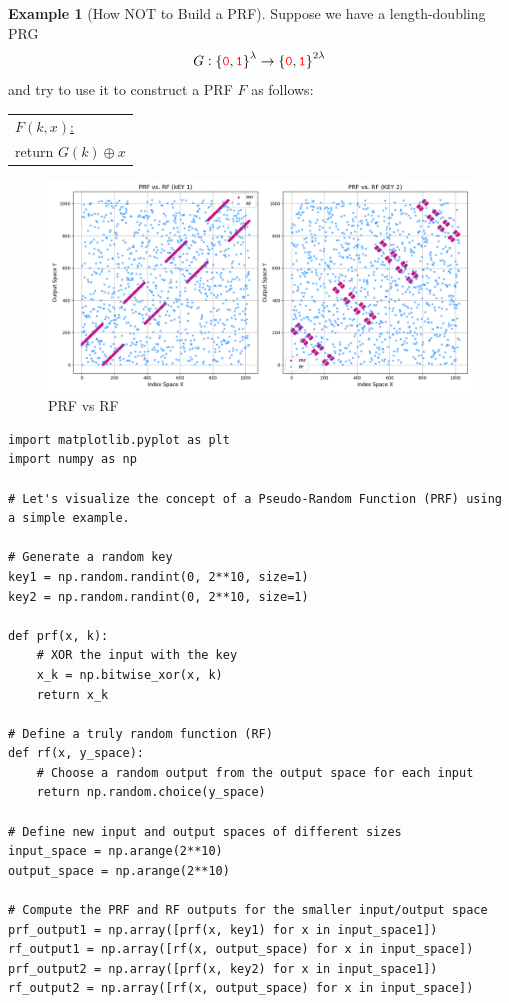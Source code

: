 \documentclass[12pt,openany]{book}
\theoremstyle{definition}
\newtheorem{example}{Example}[chapter]
\newcommand{\zero}{\textcolor{red}{\texttt{0}}}
\newcommand{\one}{\textcolor{red}{\texttt{1}}}
\newcommand{\tab}{\hspace{12pt}}
\newcommand{\xor}{\oplus}
\newcommand{\binaryfield}{\set{\zero,\one}}
\begin{document}
\begin{example}[How NOT to Build a PRF]
	Suppose we have a length-doubling PRG \[
	G:\binaryfield^{\lambda}\to\binaryfield^{2\lambda}
	\] and try to use it to construct a PRF $F$ as follows:
	\begin{table}[h!]\centering
		\begin{tabular}{|l|}
			\hline
			\underline{$F(k,x)$:}\\
			\tab return $G(k)\xor x$\\
			\hline
		\end{tabular}
	\end{table}
	
	\begin{figure}[h!]\centering
		\includegraphics[width=\textwidth, height=.36\textheight]{prf.png}
		\caption{PRF vs RF}
	\end{figure}
	\begin{lstlisting}[style=sage]
import matplotlib.pyplot as plt
import numpy as np

# Let's visualize the concept of a Pseudo-Random Function (PRF) using a simple example.

# Generate a random key
key1 = np.random.randint(0, 2**10, size=1)
key2 = np.random.randint(0, 2**10, size=1)

def prf(x, k):
	# XOR the input with the key
	x_k = np.bitwise_xor(x, k)
	return x_k

# Define a truly random function (RF)
def rf(x, y_space):
	# Choose a random output from the output space for each input
	return np.random.choice(y_space)

# Define new input and output spaces of different sizes
input_space = np.arange(2**10)
output_space = np.arange(2**10)

# Compute the PRF and RF outputs for the smaller input/output space
prf_output1 = np.array([prf(x, key1) for x in input_space1])
rf_output1 = np.array([rf(x, output_space) for x in input_space])
prf_output2 = np.array([prf(x, key2) for x in input_space1])
rf_output2 = np.array([rf(x, output_space) for x in input_space])


\end{lstlisting}
\end{example}
\end{document}
